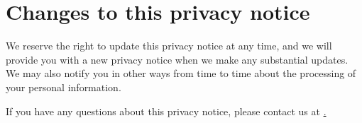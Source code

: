 \documentclass[12pt]{article}
\begin{document}
\section*{Changes to this privacy notice}
We reserve the right to update this privacy notice at any time, and we will provide you with a new privacy notice when we make any substantial updates. We may also notify you in other ways from time to time about the processing of your personal information. 

If you have any questions about this privacy notice, please contact us at \href{mailto:sucss@soton.ac.uk?subject=Privacy Notice Enquiry}.
\end{document}
